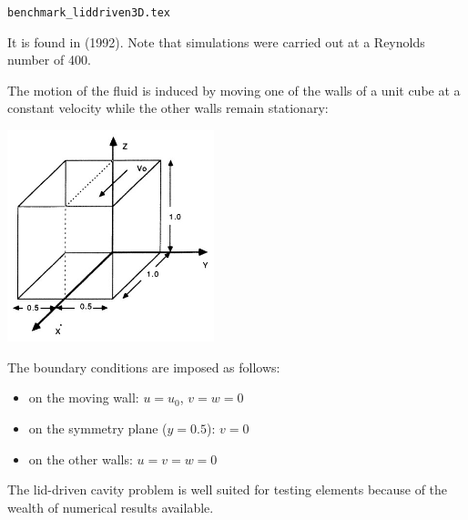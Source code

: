 
\begin{flushright} {\tiny {\color{gray} \tt benchmark\_liddriven3D.tex}} \end{flushright}

It is found in \textcite{begt92} (1992). Note that simulations were carried out at a Reynolds number of 400.

The motion of the fluid is induced by moving one of the walls of a unit cube at a
constant velocity while the other walls remain stationary:
\begin{center}
\includegraphics[width=6cm]{images/benchmark_liddriven3D/setup}
\end{center}


The boundary conditions are imposed as follows:
\begin{itemize}
\item on the moving wall: $u=u_0$, $v=w=0$
\item on the symmetry plane ($y=0.5$): $v=0$
\item on the other walls: $u=v=w=0$
\end{itemize}
The lid-driven cavity problem is well suited for testing elements because of the wealth of
numerical results available.

